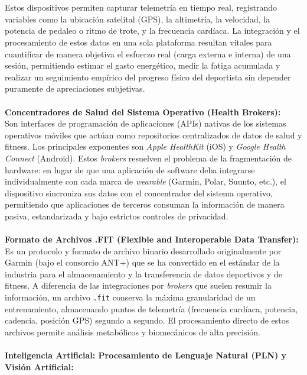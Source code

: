 \documentclass[12pt]{article}
\begin{document}
\\\\
Estos dispositivos permiten capturar telemetría en tiempo real, registrando variables como la ubicación satelital (GPS), la altimetría, la velocidad, la potencia de pedaleo o ritmo de trote, y la frecuencia cardíaca. La integración y el procesamiento de estos datos en una sola plataforma resultan vitales para cuantificar de manera objetiva el esfuerzo real (carga externa e interna) de una sesión, permitiendo estimar el gasto energético, medir la fatiga acumulada y realizar un seguimiento empírico del progreso físico del deportista sin depender puramente de apreciaciones subjetivas.
\\\\
\textbf{Concentradores de Salud del Sistema Operativo (Health Brokers):}\\
Son interfaces de programación de aplicaciones (APIs) nativas de los sistemas operativos móviles que actúan como repositorios centralizados de datos de salud y fitness. Los principales exponentes son \textit{Apple HealthKit} (iOS) y \textit{Google Health Connect} (Android). Estos \textit{brokers} resuelven el problema de la fragmentación de hardware: en lugar de que una aplicación de software deba integrarse individualmente con cada marca de \textit{wearable} (Garmin, Polar, Suunto, etc.), el dispositivo sincroniza sus datos con el concentrador del sistema operativo, permitiendo que aplicaciones de terceros consuman la información de manera pasiva, estandarizada y bajo estrictos controles de privacidad.
\\\\
\textbf{Formato de Archivos .FIT (Flexible and Interoperable Data Transfer):}\\
Es un protocolo y formato de archivo binario desarrollado originalmente por Garmin (bajo el consorcio ANT+) que se ha convertido en el estándar de la industria para el almacenamiento y la transferencia de datos deportivos y de fitness. A diferencia de las integraciones por \textit{brokers} que suelen resumir la información, un archivo \texttt{.fit} conserva la máxima granularidad de un entrenamiento, almacenando puntos de telemetría (frecuencia cardíaca, potencia, cadencia, posición GPS) segundo a segundo. El procesamiento directo de estos archivos permite análisis metabólicos y biomecánicos de alta precisión.
\\\\
\textbf{Inteligencia Artificial: Procesamiento de Lenguaje Natural (PLN) y Visión Artificial:}\\
\end{document}
